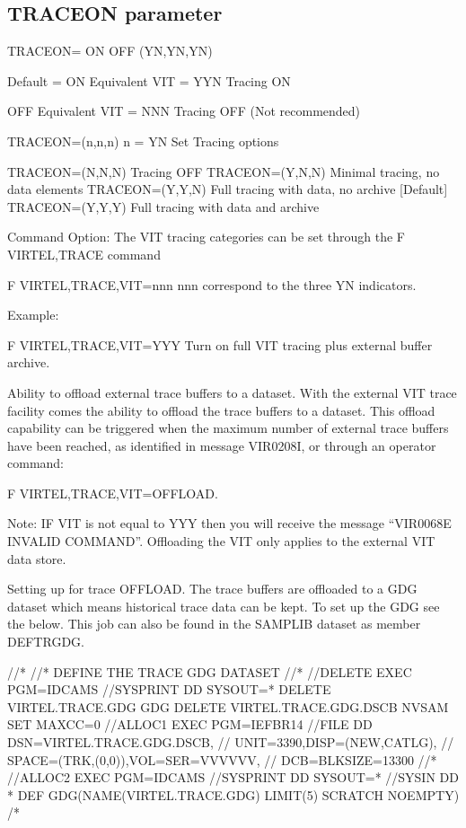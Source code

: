 \documentclass[letterpaper,10pt,english]{sphinxmanual}
\begin{document}
\subsection{TRACEON parameter}
\label{\detokenize{Installation_Guide:index-130}}\label{\detokenize{Installation_Guide:traceon-parameter}}
\begin{sphinxVerbatim}[commandchars=\\\{\}]
TRACEON= ON \textbar{} OFF \textbar{} (Y\textbar{}N,Y\textbar{}N,Y\textbar{}N)

Default = ON    Equivalent VIT = YYN    Tracing ON

OFF             Equivalent VIT = NNN    Tracing OFF (Not recommended)

TRACEON=(n,n,n)         n = Y\textbar{}N         Set Tracing options

TRACEON=(N,N,N)                 Tracing OFF
TRACEON=(Y,N,N)                 Minimal tracing, no data elements
TRACEON=(Y,Y,N)                 Full tracing with data, no archive [Default]
TRACEON=(Y,Y,Y)                 Full tracing with data and archive

Command Option:
The VIT tracing categories can be set through the F VIRTEL,TRACE command

F VIRTEL,TRACE,VIT=nnn                  nnn correspond to the three Y\textbar{}N indicators.

Example:

F VIRTEL,TRACE,VIT=YYY                  Turn on full VIT tracing plus external buffer archive.

Ability to offload external trace buffers to a dataset.
With the external VIT trace facility comes the ability to offload the trace buffers to a dataset. This offload capability can be triggered when the maximum number of external trace buffers have been reached, as identified in message VIR0208I, or through an operator command:

F VIRTEL,TRACE,VIT=OFFLOAD.

Note: IF VIT is not equal to YYY then you will receive the message “VIR0068E INVALID COMMAND”. Offloading the VIT only applies to the external VIT data store.

Setting up for trace \PYGZdq{}OFFLOAD\PYGZdq{}.
The trace buffers are offloaded to a GDG dataset which means historical trace data can be kept. To set up the GDG see the below. This job can also be found in the SAMPLIB dataset as member DEFTRGDG.

//*
//* DEFINE THE TRACE GDG DATASET
//*
//DELETE   EXEC PGM=IDCAMS
//SYSPRINT DD SYSOUT=*
 DELETE VIRTEL.TRACE.GDG GDG
 DELETE VIRTEL.TRACE.GDG.DSCB NVSAM
 SET MAXCC=0
//ALLOC1   EXEC PGM=IEFBR14
//FILE     DD DSN=VIRTEL.TRACE.GDG.DSCB,
//            UNIT=3390,DISP=(NEW,CATLG),
//            SPACE=(TRK,(0,0)),VOL=SER=VVVVVV,
//            DCB=BLKSIZE=13300
//*
//ALLOC2   EXEC PGM=IDCAMS
//SYSPRINT  DD SYSOUT=*
//SYSIN     DD *
 DEF GDG(NAME(VIRTEL.TRACE.GDG) LIMIT(5) SCRATCH NOEMPTY)
/*
\end{sphinxVerbatim}
\end{document}
